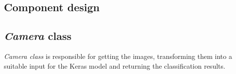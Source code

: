 \subsection{Component design}

\subsection{\textit{Camera} class}
\emph{\textit{Camera} class} is responsible for getting the images, transforming them into a suitable input for the Keras model and returning the classification results.

